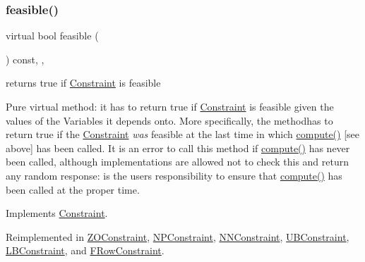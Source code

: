 \mbox{\label{class_s_m_spp__di__unipi__it_1_1_row_constraint_a508a569b1ce65668a4bbe261b0e2efab}} 
\subsubsection{\texorpdfstring{feasible()}{feasible()}}
{\footnotesize\ttfamily virtual bool feasible (\begin{DoxyParamCaption}\item[{void}]{ }\end{DoxyParamCaption}) const\hspace{0.3cm}{\ttfamily [inline]}, {\ttfamily [override]}, {\ttfamily [virtual]}}



returns true if \mbox{\hyperlink{class_s_m_spp__di__unipi__it_1_1_constraint}{Constraint}} is feasible 

Pure virtual method\+: it has to return true if \mbox{\hyperlink{class_s_m_spp__di__unipi__it_1_1_constraint}{Constraint}} is feasible given the values of the Variables it depends onto. More specifically, the methodhas to return true if the \mbox{\hyperlink{class_s_m_spp__di__unipi__it_1_1_constraint}{Constraint}} {\itshape was} feasible at the last time in which \mbox{\hyperlink{class_s_m_spp__di__unipi__it_1_1_row_constraint_a504d4e3e174c7a518cc66156a8a45ce5}{compute()}} \mbox{[}see above\mbox{]} has been called. It is an error to call this method if \mbox{\hyperlink{class_s_m_spp__di__unipi__it_1_1_row_constraint_a504d4e3e174c7a518cc66156a8a45ce5}{compute()}} has never been called, although implementations are allowed not to check this and return any random response\+: is the users\textquotesingle{} responsibility to ensure that \mbox{\hyperlink{class_s_m_spp__di__unipi__it_1_1_row_constraint_a504d4e3e174c7a518cc66156a8a45ce5}{compute()}} has been called at the proper time. 

Implements \mbox{\hyperlink{class_s_m_spp__di__unipi__it_1_1_constraint_a29e571bbd4e2f1046c56e39c06633c4c}{Constraint}}.



Reimplemented in \mbox{\hyperlink{class_s_m_spp__di__unipi__it_1_1_z_o_constraint_a575ce9dd82d423f5d6e9699622935415}{Z\+O\+Constraint}}, \mbox{\hyperlink{class_s_m_spp__di__unipi__it_1_1_n_p_constraint_a575ce9dd82d423f5d6e9699622935415}{N\+P\+Constraint}}, \mbox{\hyperlink{class_s_m_spp__di__unipi__it_1_1_n_n_constraint_a575ce9dd82d423f5d6e9699622935415}{N\+N\+Constraint}}, \mbox{\hyperlink{class_s_m_spp__di__unipi__it_1_1_u_b_constraint_a575ce9dd82d423f5d6e9699622935415}{U\+B\+Constraint}}, \mbox{\hyperlink{class_s_m_spp__di__unipi__it_1_1_l_b_constraint_a575ce9dd82d423f5d6e9699622935415}{L\+B\+Constraint}}, and \mbox{\hyperlink{class_s_m_spp__di__unipi__it_1_1_f_row_constraint_a508a569b1ce65668a4bbe261b0e2efab}{F\+Row\+Constraint}}.


